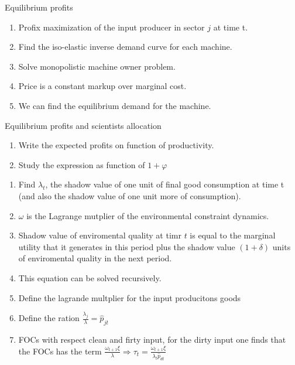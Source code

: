 \documentclass[aspectratio=169,xcolor=dvipsnames]{beamer}
\begin{document}
\begin{frame}{Equilibrium profits}
    \begin{enumerate}
        \item Profix maximization of the input producer in sector $j$ at time t.
        \item Find the iso-elastic inverse demand curve for each machine. 
        \item Solve monopolistic machine owner problem. 
        \item Price is a constant markup over marginal cost.
        \item We can find the equilibrium demand for the machine. 
    \end{enumerate}
\end{frame}

\begin{frame}{Equilibrium profits and scientists allocation}
    \begin{enumerate}
        \item Write the expected profits on function of productivity.
        \item Study the expression as function of $1+\varphi$
    \end{enumerate}
\end{frame}

\begin{frame}
    \begin{enumerate}
        \item Find $\lambda_t$, the shadow value of one unit of final good consumption at time t (and also the shadow value of one unit more of consumption).
        \item $\omega$ is the Lagrange mutplier of the environmental constraint dynamics.
        \item Shadow value of enviromental quality at timr $t$ is equal to the marginal utility that it generates in this period plus the shadow value $(1+\delta)$ units of enviromental quality in the next period.
        \item This equation can be solved recursively.
        \item Define the lagrande multplier for the input producitons goods    \item Define the ration $\frac{\lambda_j}{\lambda} = \hat{p}_{jt}$ 
        \item FOCs with respect clean and firty input, for the dirty input one finds that the FOCs has the term $\frac{\omega_{t+1}\xi}{\lambda} \Rightarrow \tau_t = \frac{\omega_{t+1}\xi}{\lambda_t \hat{p}_{dt}}$
    \end{enumerate}
\end{frame}




\end{document}
